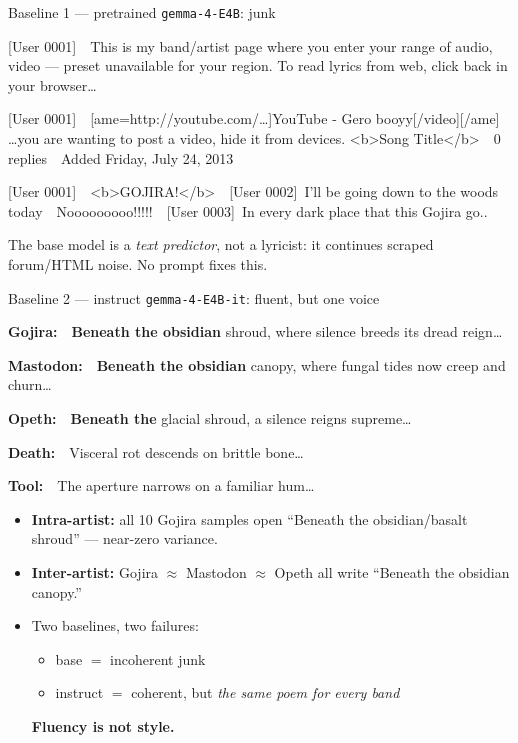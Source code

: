 \documentclass[aspectratio=169]{beamer}
\newcommand{\take}[1]{\vskip3pt\footnotesize\textcolor{accent}{#1}}
\newcommand{\lt}{\textless}
\newcommand{\gt}{\textgreater}
\begin{document}
\begin{frame}{Baseline 1 --- pretrained \texttt{gemma-4-E4B}: junk}
  \scriptsize\ttfamily\color{junk}\raggedright
  [User 0001]\ \ This is my band/artist page where you enter your range of audio, video --- preset unavailable for your region. To read lyrics from web, click back in your browser\ldots\par\vskip4pt
  [User 0001]\ \ [ame=http://youtube.com/\ldots]YouTube - Gero booyy[/video][/ame] \ldots you are wanting to post a video, hide it from devices. {\lt}b{\gt}Song Title{\lt}/b{\gt}\ \ 0 replies\ \ Added Friday, July 24, 2013\par\vskip4pt
  [User 0001]\ \ {\lt}b{\gt}GOJIRA!{\lt}/b{\gt}\ \ [User 0002]\ I'll be going down to the woods today\ \ Nooooooooo!!!!!\ \ [User 0003]\ In every dark place that this Gojira go..\par
  \normalfont\color{white}
  \take{The base model is a \emph{text predictor}, not a lyricist: it continues scraped forum/HTML noise. No prompt fixes this.}
\end{frame}

\begin{frame}{Baseline 2 --- instruct \texttt{gemma-4-E4B-it}: fluent, but one voice}
  \scriptsize\itshape\raggedright
  \textbf{\upshape Gojira:}\ \ \textbf{Beneath the obsidian} shroud, where silence breeds its dread reign\ldots\par
  \textbf{\upshape Mastodon:}\ \ \textbf{Beneath the obsidian} canopy, where fungal tides now creep and churn\ldots\par
  \textbf{\upshape Opeth:}\ \ \textbf{Beneath the} glacial shroud, a silence reigns supreme\ldots\par
  \textbf{\upshape Death:}\ \ Visceral rot descends on brittle bone\ldots\par
  \textbf{\upshape Tool:}\ \ The aperture narrows on a familiar hum\ldots\par
  \upshape\vskip4pt
  \footnotesize
  \begin{itemize}
    \item \textbf{Intra-artist:} all 10 Gojira samples open ``Beneath the obsidian/basalt shroud'' --- near-zero variance.
    \item \textbf{Inter-artist:} Gojira $\approx$ Mastodon $\approx$ Opeth all write ``Beneath the obsidian canopy.''
    \item \textcolor{accent}{Two baselines, two failures:}
      \begin{itemize}
        \item \textcolor{accent}{base $=$ incoherent junk}
        \item \textcolor{accent}{instruct $=$ coherent, but \emph{the same poem for every band}}
      \end{itemize}
      \textcolor{accent}{\textbf{Fluency is not style.}}
  \end{itemize}
\end{frame}
\end{document}
